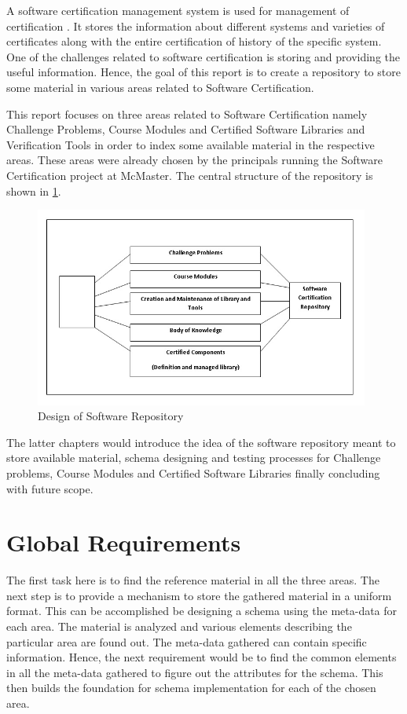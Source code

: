 \documentclass[11pt,letterpaper]{report}
\begin{document}
A software certification management system is used for management of certification \cite{SCMS}. It stores the information about different systems and varieties of certificates along with the entire certification of history of the specific system. One of the challenges related to software certification is storing and providing the useful information. Hence, the goal of this report is to create a repository to store some material in various areas related to Software Certification.

This report focuses on three areas related to Software Certification namely Challenge Problems, Course Modules and Certified Software Libraries and Verification Tools in order to index some available material in the respective areas. These areas were already chosen by the principals running the Software Certification project at McMaster. The central structure of the repository is shown in \ref{Fig:1}.

\begin{figure}[ht]
\centering
\includegraphics[width=110mm]{Images/Overview_SW_Repo.jpg}
\caption{Design of Software Repository}
\label{Fig:1}
\end{figure}
\pagebreak
The latter chapters would introduce the idea of the software repository meant to store available material, schema designing and testing processes for Challenge problems, Course Modules and Certified Software Libraries finally concluding with future scope.

\chapter{Global Requirements}
The first task here is to find the reference material in all the three areas. The next step is to provide a mechanism to store the gathered material in a uniform format. This can be accomplished be designing a schema using the meta-data for each area. The material is analyzed and various elements describing the particular area are found out. The meta-data gathered can contain specific information. Hence, the next requirement would be to find the common elements in all the meta-data gathered to figure out the attributes for the schema. This then builds the foundation for schema implementation for each of the chosen area.\newline
\end{document}
